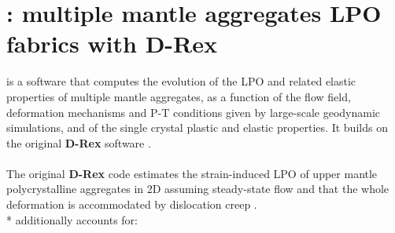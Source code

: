 \chapter{\drexmtitle: multiple mantle aggregates LPO fabrics with D-Rex}
\label{chapter:drexm}

\drexmtitle{} is a software that computes the evolution of the LPO and related elastic properties of multiple mantle aggregates, as a function of the flow field, deformation mechanisms and P-T conditions given by large-scale geodynamic simulations, and of the single crystal plastic and elastic properties. It builds on the original \textbf{D-Rex} software \citep{kaminski2004gji}.\\
\\
The original \textbf{D-Rex} code estimates the strain-induced LPO of upper mantle polycrystalline aggregates in 2D assuming steady-state flow and that the whole deformation is accommodated by dislocation creep \citep{kaminski2004gji}.\\*
\drexmtitle{} additionally accounts for:
